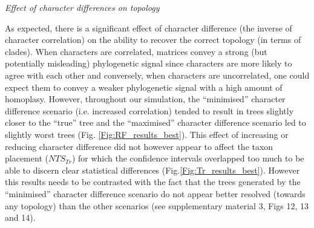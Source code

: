 \documentclass[12pt,letterpaper]{article}
\renewcommand{\subsection}[1]{%
\bigskip
\begin{center}
\begin{large}
\normalfont\itshape #1
\end{large}
\end{center}}
\begin{document}
\subsection{Effect of character differences on topology}%
As expected, there is a significant effect of character difference (the inverse of character correlation) on the ability to recover the correct topology (in terms of clades).
When characters are correlated, matrices convey a strong (but potentially misleading) phylogenetic signal since characters are more likely to agree with each other and conversely, when characters are uncorrelated, one could expect them to convey a weaker phylogenetic signal with a high amount of homoplasy. %
However, throughout our simulation, the ``minimised'' character difference scenario (i.e. increased correlation) tended to result in trees slightly closer to the ``true'' tree and the ``maximised'' character difference scenario led to slightly worst trees (Fig. \ref{Fig:RF_results_best}).
This effect of increasing or reducing character difference did not however appear to affect the taxon placement ($NTS_{Tr}$) for which the confidence intervals overlapped too much to be able to discern clear statistical differences (Fig.\ref{Fig:Tr_results_best}).
However this results needs to be contrasted with the fact that the trees generated by the ``minimised'' character difference scenario do not appear better resolved (towards any topology) than the other scenarios (see supplementary material 3, Figs 12, 13 and 14).
\end{document}
